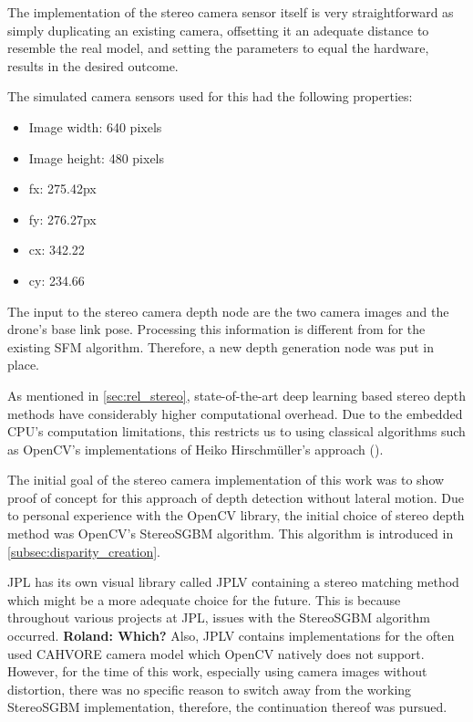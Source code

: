 The implementation of the stereo camera sensor itself is very straightforward as simply duplicating an existing camera, offsetting it an adequate distance to resemble the real model, and setting the parameters to equal the hardware, results in the desired outcome.

The simulated camera sensors used for this had the following properties:

\begin{itemize}
    \item Image width: 640 pixels
    \item Image height: 480 pixels
    \item fx: 275.42px
    \item fy: 276.27px
    \item cx: 342.22
    \item cy: 234.66
\end{itemize}

The input to the stereo camera depth node are the two camera images and the drone's base link pose. Processing this information is different from for the existing SFM algorithm. Therefore, a new depth generation node was put in place. 

As mentioned in \cref{sec:rel_stereo}, state-of-the-art deep learning based stereo depth methods have considerably higher computational overhead. Due to the embedded CPU's computation limitations, this restricts us to using classical algorithms such as OpenCV's implementations of Heiko Hirschmüller's approach (\citep{Stereo}).

The initial goal of the stereo camera implementation of this work was to show proof of concept for this approach of depth detection without lateral motion. Due to personal experience with the OpenCV library, the initial choice of stereo depth method was OpenCV's StereoSGBM algorithm. This algorithm is introduced in \cref{subsec:disparity_creation}.

JPL has its own visual library called JPLV containing a stereo matching method which might be a more adequate choice for the future. This is because throughout various projects at JPL, issues with the StereoSGBM algorithm occurred. \textbf{\@ Roland: Which?}
Also, JPLV contains implementations for the often used CAHVORE camera model which OpenCV natively does not support. However, for the time of this work, especially using camera images without distortion, there was no specific reason to switch away from the working StereoSGBM implementation, therefore, the continuation thereof was pursued.

